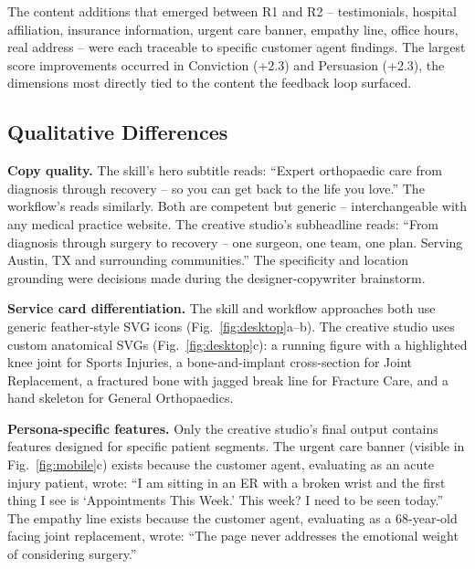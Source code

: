 \documentclass[conference]{IEEEtran}
\begin{document}
The content additions that emerged between R1 and R2 -- testimonials, hospital affiliation, insurance information, urgent care banner, empathy line, office hours, real address -- were each traceable to specific customer agent findings. The largest score improvements occurred in Conviction (+2.3) and Persuasion (+2.3), the dimensions most directly tied to the content the feedback loop surfaced.

\subsection{Qualitative Differences}\label{qualitative-differences}

\textbf{Copy quality.} The skill's hero subtitle reads: ``Expert orthopaedic care from diagnosis through recovery -- so you can get back to the life you love.'' The workflow's reads similarly. Both are competent but generic -- interchangeable with any medical practice website. The creative studio's subheadline reads: ``From diagnosis through surgery to recovery -- one surgeon, one team, one plan. Serving Austin, TX and surrounding communities.'' The specificity and location grounding were decisions made during the designer-copywriter brainstorm.

\textbf{Service card differentiation.} The skill and workflow approaches both use generic feather-style SVG icons (Fig.~\ref{fig:desktop}a--b). The creative studio uses custom anatomical SVGs (Fig.~\ref{fig:desktop}c): a running figure with a highlighted knee joint for Sports Injuries, a bone-and-implant cross-section for Joint Replacement, a fractured bone with jagged break line for Fracture Care, and a hand skeleton for General Orthopaedics.

\textbf{Persona-specific features.} Only the creative studio's final output contains features designed for specific patient segments. The urgent care banner (visible in Fig.~\ref{fig:mobile}c) exists because the customer agent, evaluating as an acute injury patient, wrote: ``I am sitting in an ER with a broken wrist and the first thing I see is `Appointments This Week.' This week? I need to be seen today.'' The empathy line exists because the customer agent, evaluating as a 68-year-old facing joint replacement, wrote: ``The page never addresses the emotional weight of considering surgery.''
\end{document}

